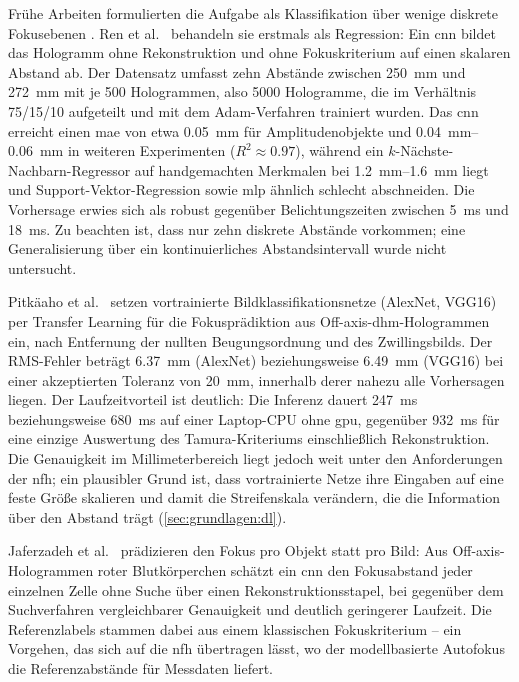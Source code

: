 Frühe Arbeiten formulierten die Aufgabe als Klassifikation über wenige
diskrete Fokusebenen \cite{pitkaaho2017performance}. Ren et al.\
\cite{ren2018learning} behandeln sie erstmals als Regression: Ein \ac{cnn} bildet das Hologramm
ohne Rekonstruktion und ohne Fokuskriterium auf einen skalaren Abstand ab.
Der Datensatz umfasst zehn Abstände zwischen \qty{250}{\milli\metre} und
\qty{272}{\milli\metre} mit je 500 Hologrammen, also 5000 Hologramme, die
im Verhältnis 75/15/10 aufgeteilt und mit dem Adam-Verfahren trainiert
wurden. Das \ac{cnn} erreicht einen \ac{mae} von etwa \qty{0.05}{\milli\metre}
für Amplitudenobjekte und \qtyrange{0.04}{0.06}{\milli\metre} in weiteren
Experimenten ($R^2 \approx 0.97$), während ein $k$-Nächste-Nachbarn-Regressor
auf handgemachten Merkmalen bei \qtyrange{1.2}{1.6}{\milli\metre} liegt und
Support-Vektor-Regression sowie \ac{mlp} ähnlich schlecht abschneiden. Die
Vorhersage erwies sich als robust gegenüber Belichtungszeiten zwischen
\qty{5}{\milli\second} und \qty{18}{\milli\second}. Zu beachten ist, dass
nur zehn diskrete Abstände vorkommen; eine Generalisierung über ein
kontinuierliches Abstandsintervall wurde nicht untersucht.

Pitkäaho et al.\ \cite{pitkaaho2019focus} setzen vortrainierte Bildklassifikationsnetze
(AlexNet, VGG16) per Transfer Learning für die Fokusprädiktion aus
Off-axis-\ac{dhm}-Hologrammen ein, nach Entfernung der nullten
Beugungsordnung und des Zwillingsbilds. Der RMS-Fehler beträgt
\qty{6.37}{\milli\metre} (AlexNet) beziehungsweise \qty{6.49}{\milli\metre}
(VGG16) bei einer akzeptierten Toleranz von \qty{20}{\milli\metre}, innerhalb
derer nahezu alle Vorhersagen liegen. Der Laufzeitvorteil ist deutlich: Die
Inferenz dauert \qty{247}{\milli\second} beziehungsweise
\qty{680}{\milli\second} auf einer Laptop-CPU ohne \ac{gpu}, gegenüber
\qty{932}{\milli\second} für eine einzige Auswertung des Tamura-Kriteriums
einschließlich Rekonstruktion. Die Genauigkeit im Millimeterbereich liegt
jedoch weit unter den Anforderungen der \ac{nfh}; ein plausibler Grund ist,
dass vortrainierte Netze ihre Eingaben auf eine feste Größe skalieren und
damit die Streifenskala verändern, die die Information über den Abstand
trägt (\cref{sec:grundlagen:dl}).

Jaferzadeh et al.\ \cite{jaferzadeh2019nosearch} prädizieren den Fokus pro Objekt statt pro
Bild: Aus Off-axis-Hologrammen roter Blutkörperchen schätzt ein \ac{cnn}
den Fokusabstand jeder einzelnen Zelle ohne Suche über einen
Rekonstruktionsstapel, bei gegenüber dem Suchverfahren vergleichbarer
Genauigkeit und deutlich geringerer Laufzeit. Die Referenzlabels stammen
dabei aus einem klassischen Fokuskriterium -- ein Vorgehen, das sich auf die
\ac{nfh} übertragen lässt, wo der modellbasierte Autofokus die
Referenzabstände für Messdaten liefert.


